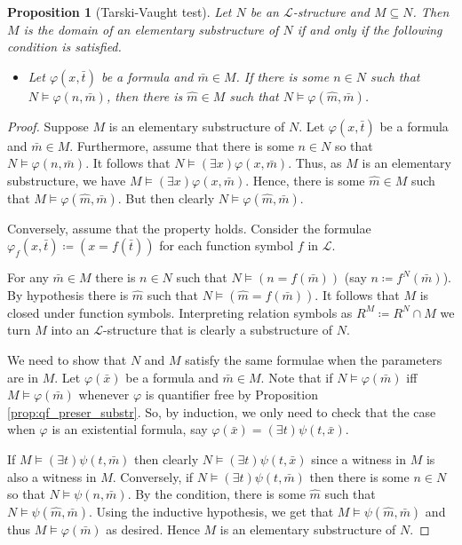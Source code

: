 \documentclass{report}
\theoremstyle{definition}
\theoremstyle{plain}
\newtheorem{prop}[thm]{Proposition}
\theoremstyle{definition}
\begin{document}
 		\begin{prop}[Tarski-Vaught test]
 			Let $N$ be an $\mathcal{L}$-structure and $M\subseteq N$. Then $M$ is the domain of an elementary substructure of $N$ if and only if the following condition is satisfied.
 			\begin{itemize}
 				\item Let $\varphi(x,\bar{t})$ be a formula and $\bar{m}\in M$. If there is some $n\in N$ such that $N\models \varphi(n,\bar{m})$, then there is $\hat{m}\in M$ such that $N \models \varphi(\hat{m},\bar{m})$.
 			\end{itemize}
 		\end{prop}
 		\begin{proof}
 			Suppose $M$ is an elementary substructure of $N$. Let $\varphi(x,\bar{t})$ be a formula and $\bar{m}\in M$. Furthermore, assume that there is some $n\in N$ so that $N\models \varphi(n,\bar{m})$. It follows that $N\models (\exists x)\varphi(x,\bar{m})$. Thus, as $M$ is an elementary substructure, we have $M \models (\exists x)\varphi(x,\bar{m})$. Hence, there is some $\hat{m}\in M$ such that $M \models \varphi(\hat{m},\bar{m})$. But then clearly $N \models \varphi(\hat{m},\bar{m})$.
 			
 			Conversely, assume that the property holds. Consider the formulae $\varphi_f(x,\bar{t}) \coloneqq (x = f(\bar{t}))$ for each function symbol $f$ in $\mathcal{L}$.
 			
 			For any $\bar{m}\in M$ there is $n\in N$ such that $N\models (n = f(\bar{m}))$ (say $n\coloneqq f^N(\bar{m})$). By hypothesis there is $\hat{m}$ such that $N \models (\hat{m} = f(\bar{m}))$. It follows that $M$ is closed under function symbols. Interpreting relation symbols as $R^M \coloneqq R^N \cap M$ we turn $M$ into an $\mathcal{L}$-structure that is clearly a substructure of $N$. 			
 			
 			We need to show that $N$ and $M$ satisfy the same formulae when the parameters are in $M$. Let $\varphi(\bar{x})$ be a formula and $\bar{m}\in M$. Note that if $N \models \varphi(\bar{m})$ iff $M \models \varphi(\bar{m})$ whenever $\varphi$ is quantifier free by Proposition \ref{prop:qf_preser_substr}. So, by induction, we only need to check that the case when $\varphi$ is an existential formula, say $\varphi(\bar{x}) = (\exists t)\psi(t, \bar{x})$.
 			
 			If $M \models (\exists t)\psi(t, \bar{m})$ then clearly $N \models (\exists t)\psi(t, \bar{x})$ since a witness in $M$ is also a witness in $M$. Conversely, if $N \models (\exists t)\psi(t, \bar{m})$ then there is some $n\in N$ so that $N\models \psi(n,\bar{m})$. By the condition, there is some $\hat{m}$ such that $N \models \psi(\hat{m},\bar{m})$. Using the inductive hypothesis, we get that $M \models \psi(\hat{m},\bar{m})$ and thus $M \models \varphi(\bar{m})$ as desired. Hence $M$ is an elementary substructure of $N$.
 		\end{proof}
\end{document}
